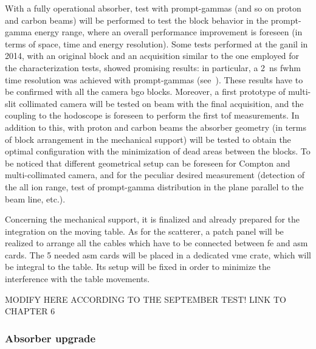 With a fully operational absorber, test with prompt-gammas (and so on proton and carbon beams) will be performed to test the block behavior in the prompt-gamma energy range, where an overall performance improvement is foreseen (in terms of space, time and energy resolution). Some tests performed at the \gls{ganil} in 2014, with an original block and an acquisition similar to the one employed for the characterization tests, showed promising results: in particular, a 2~ns \gls{fwhm} time resolution was achieved with prompt-gammas (see~\cite{Ley2015}). These results have to be confirmed with all the camera \gls{bgo} blocks. Moreover, a first prototype of multi-slit collimated camera will be tested on beam with the final acquisition, and the coupling to the hodoscope is foreseen to perform the first \gls{tof} measurements. In addition to this, with proton and carbon beams the absorber geometry (in terms of block arrangement in the mechanical support) will be tested to obtain the optimal configuration with the minimization of dead areas between the blocks. To be noticed that different geometrical setup can be foreseen for Compton and multi-collimated camera, and for the peculiar desired measurement (detection of the all ion range, test of prompt-gamma distribution in the plane parallel to the beam line, etc.).

Concerning the mechanical support, it is finalized and already prepared for the integration on the moving table. As for the scatterer, a patch panel will be realized to arrange all the cables which have to be connected between \gls{fe} and \gls{asm} cards. The 5 needed \gls{asm} cards will be placed in a dedicated \gls{vme} crate, which will be integral to the table. Its setup will be fixed in order to minimize the interference with the table movements.


MODIFY HERE ACCORDING TO THE SEPTEMBER TEST! LINK TO CHAPTER 6  

\subsubsection{Absorber upgrade}\label{chap3::subsubsec::absUpgrade} 

